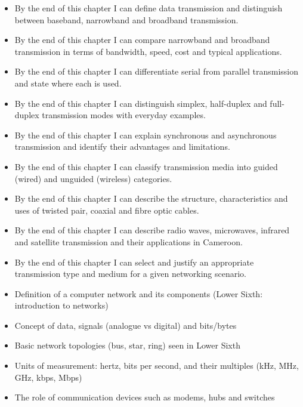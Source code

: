\documentclass[11pt]{article}
\begin{document}
\begin{objectifs}
\begin{itemize}
\item By the end of this chapter I can define data transmission and distinguish between baseband, narrowband and broadband transmission.
\item By the end of this chapter I can compare narrowband and broadband transmission in terms of bandwidth, speed, cost and typical applications.
\item By the end of this chapter I can differentiate serial from parallel transmission and state where each is used.
\item By the end of this chapter I can distinguish simplex, half-duplex and full-duplex transmission modes with everyday examples.
\item By the end of this chapter I can explain synchronous and asynchronous transmission and identify their advantages and limitations.
\item By the end of this chapter I can classify transmission media into guided (wired) and unguided (wireless) categories.
\item By the end of this chapter I can describe the structure, characteristics and uses of twisted pair, coaxial and fibre optic cables.
\item By the end of this chapter I can describe radio waves, microwaves, infrared and satellite transmission and their applications in Cameroon.
\item By the end of this chapter I can select and justify an appropriate transmission type and medium for a given networking scenario.
\end{itemize}
\end{objectifs}

\begin{prerequis}
\begin{itemize}
\item Definition of a computer network and its components (Lower Sixth: introduction to networks)
\item Concept of data, signals (analogue vs digital) and bits/bytes
\item Basic network topologies (bus, star, ring) seen in Lower Sixth
\item Units of measurement: hertz, bits per second, and their multiples (kHz, MHz, GHz, kbps, Mbps)
\item The role of communication devices such as modems, hubs and switches
\end{itemize}
\end{prerequis}
\end{document}
